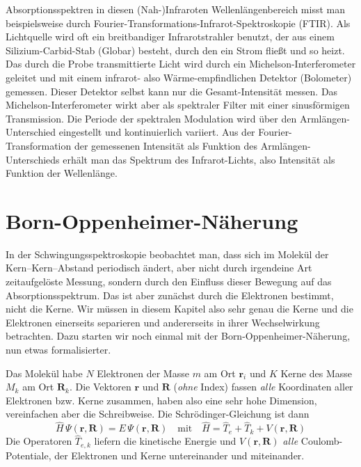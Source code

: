 Absorptionsspektren in diesen (Nah-)Infraroten Wellenlängenbereich misst man beispielsweise durch Fourier-Transformations-Infrarot-Spektroskopie (FTIR). Als Lichtquelle wird oft ein breitbandiger Infrarotstrahler benutzt, der aus einem Silizium-Carbid-Stab (Globar) besteht, durch den ein Strom fließt und so heizt. Das durch die Probe transmittierte Licht wird durch ein Michelson-Interferometer geleitet und mit einem infrarot-  also Wärme-empfindlichen Detektor (Bolometer) gemessen. Dieser Detektor selbst kann nur die Gesamt-Intensität messen. Das Michelson-Interferometer wirkt aber als spektraler Filter mit einer sinusförmigen Transmission. Die Periode der spektralen Modulation wird über den Armlängen-Unterschied eingestellt und kontinuierlich variiert. Aus der Fourier-Transformation der gemessenen Intensität als Funktion des Armlängen-Unterschieds erhält man das Spektrum des Infrarot-Lichts, also Intensität als Funktion der Wellenlänge.



\section{Born-Oppenheimer-Näherung}

In der Schwingungsspektroskopie beobachtet man, dass sich im Molekül der Kern--Kern--Abstand  periodisch ändert, aber nicht durch irgendeine Art zeitaufgelöste Messung, sondern durch den Einfluss dieser Bewegung auf das Absorptionsspektrum. Das ist aber zunächst durch die Elektronen bestimmt, nicht die Kerne. Wir müssen in diesem Kapitel also sehr genau die Kerne und die Elektronen einerseits separieren und andererseits in ihrer Wechselwirkung betrachten. Dazu starten wir noch einmal mit der Born-Oppenheimer-Näherung, nun etwas formalisierter.

Das Molekül habe $N$ Elektronen der Masse $m$ am Ort $\mathbf{r}_i$ und $K$ Kerne des Masse $M_k$ am Ort $\mathbf{R}_k$. Die Vektoren $\mathbf{r}$ und $\mathbf{R}$ (\emph{ohne} Index) fassen \emph{alle} Koordinaten aller Elektronen bzw. Kerne zusammen, haben also eine sehr hohe Dimension, vereinfachen aber die Schreibweise. Die Schrödinger-Gleichung ist dann
\begin{equation}
 \hat{H} \, \Psi (\mathbf{r}, \mathbf{R}) = E \, \Psi (\mathbf{r}, \mathbf{R}) \quad \text{mit} \quad
  \hat{H} =  \hat{T}_e + \hat{T}_k + V (\mathbf{r}, \mathbf{R}) 
  \label{eq:vib_SG_allg}
\end{equation}
Die Operatoren $\hat{T}_{e,k}$ liefern die kinetische Energie und  $ V (\mathbf{r}, \mathbf{R}) $ \emph{alle} Coulomb-Potentiale, der Elektronen und Kerne untereinander und miteinander.

